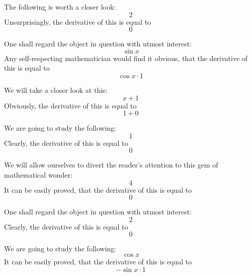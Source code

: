 \documentclass{article}
\begin{document}
The following is worth a closer look:
\begin{equation}
2 
\end{equation}
Unsurprisingly, the derivative of this is equal to
\begin{equation}
0 
\end{equation}

One shall regard the object in question with utmost interest:
\begin{equation}
\sin x 
\end{equation}
Any self-respecting mathematician would find it obvious, that the derivative of this is equal to
\begin{equation}
\cos x \cdot 1 
\end{equation}

We will take a closer look at this:
\begin{equation}
x + 1 
\end{equation}
Obviously, the derivative of this is equal to
\begin{equation}
1 + 0 
\end{equation}

We are going to study the following:
\begin{equation}
1 
\end{equation}
Clearly, the derivative of this is equal to
\begin{equation}
0 
\end{equation}

We will allow ourselves to divert the reader's attention to this gem of mathematical wonder:
\begin{equation}
4 
\end{equation}
It can be easily proved, that the derivative of this is equal to
\begin{equation}
0 
\end{equation}

One shall regard the object in question with utmost interest:
\begin{equation}
2 
\end{equation}
Clearly, the derivative of this is equal to
\begin{equation}
0 
\end{equation}

We are going to study the following:
\begin{equation}
\cos x 
\end{equation}
It can be easily proved, that the derivative of this is equal to
\begin{equation}
-\sin x \cdot 1 
\end{equation}
\end{document}
